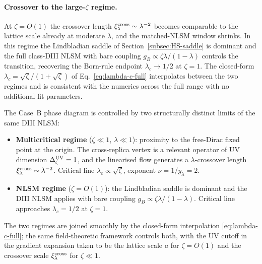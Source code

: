 \paragraph{Crossover to the large-$\zeta$ regime.}
At $\zeta=O(1)$ the crossover length
$\xi_\lambda^{\rm cross}\sim\lambda^{-2}$ becomes comparable to the
lattice scale already at moderate $\lambda$, and the matched-NLSM
window shrinks.  In this regime the Lindbladian saddle of
Section~\ref{subsec:HS-saddle} is dominant and the full class-DIII
NLSM with bare coupling $g_B\propto\zeta\lambda/(1-\lambda)$ controls
the transition, recovering the Born-rule endpoint $\lambda_c\to 1/2$
at $\zeta=1$.  The closed-form $\lambda_c=\sqrt{\zeta}/(1+\sqrt{\zeta})$
of Eq.~\eqref{eq:lambda-c-full} interpolates between the two regimes
and is consistent with the numerics across the full range with no
additional fit parameters.

\begin{remark}\label{rem:physical-interpretation}
The Case~B phase diagram is controlled by two structurally distinct
limits of the same DIII NLSM:
\begin{itemize}
  \item \textbf{Multicritical regime} ($\zeta\ll 1$, $\lambda\ll 1$):
    proximity to the free-Dirac fixed point at the origin.  The
    cross-replica vertex is a relevant operator of UV dimension
    $\Delta_\zeta^{\rm UV}=1$, and the linearised flow generates a
    $\lambda$-crossover length $\xi_\lambda^{\rm cross}\sim\lambda^{-2}$.
    Critical line $\lambda_c\propto\sqrt{\zeta}$, exponent
    $\nu=1/y_\lambda=2$.
  \item \textbf{NLSM regime} ($\zeta=O(1)$): the Lindbladian saddle
    is dominant and the DIII NLSM applies with bare coupling
    $g_B\propto\zeta\lambda/(1-\lambda)$.  Critical line approaches
    $\lambda_c=1/2$ at $\zeta=1$.
\end{itemize}
The two regimes are joined smoothly by the closed-form interpolation
\eqref{eq:lambda-c-full}; the same field-theoretic framework controls
both, with the UV cutoff in the gradient expansion taken to be the
lattice scale $a$ for $\zeta=O(1)$ and the crossover scale
$\xi_\lambda^{\rm cross}$ for $\zeta\ll 1$.
\end{remark}
